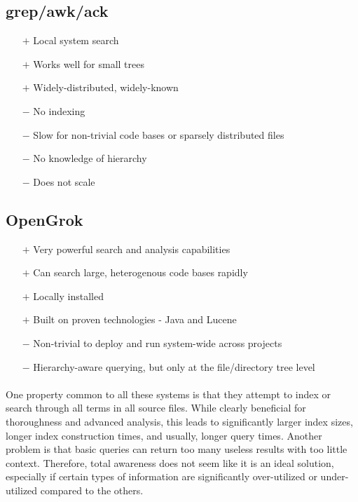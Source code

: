 \documentclass{article}
\begin{document}
\subsection{grep/awk/ack}\cite{GNU}
	\begin{itemize}
	\item[$+$] Local system search
    \item[$+$] Works well for small trees
    \item[$+$] Widely-distributed, widely-known   
   
    \item[$-$] No indexing
    \item[$-$] Slow for non-trivial code bases or sparsely distributed files
    \item[$-$] No knowledge of hierarchy
    \item[$-$] Does not scale
    \end{itemize}
    
\subsection{OpenGrok}\cite{OpenGrok}
	\begin{itemize}
    \item[$+$] Very powerful search and analysis capabilities
    \item[$+$] Can search large, heterogenous code bases rapidly
    \item[$+$] Locally installed
    \item[$+$] Built on proven technologies - Java and Lucene
    
    \item[$-$] Non-trivial to deploy and run system-wide across projects
    \item[$-$] Hierarchy-aware querying, but only at the file/directory tree level
	\end{itemize}

\paragraph{}
One property common to all these systems is that they attempt to index or search through all terms in all source files. While clearly beneficial for thoroughness and advanced analysis, this leads to significantly larger index sizes, longer index construction times, and usually, longer query times. Another problem is that basic queries can return too many useless results with too little context. Therefore, total awareness does not seem like it is an ideal solution, especially if certain types of information are significantly over-utilized or under-utilized compared to the others.
\end{document}
